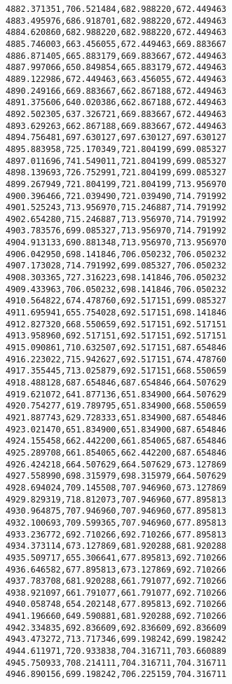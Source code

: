 \documentclass[11pt]{article}
\begin{document}
\begin{Verbatim}[commandchars=\\\{\}]
4882.371351,706.521484,682.988220,672.449463
4883.495976,686.918701,682.988220,672.449463
4884.620860,682.988220,682.988220,672.449463
4885.746003,663.456055,672.449463,669.883667
4886.871405,665.883179,669.883667,672.449463
4887.997066,650.849854,665.883179,672.449463
4889.122986,672.449463,663.456055,672.449463
4890.249166,669.883667,662.867188,672.449463
4891.375606,640.020386,662.867188,672.449463
4892.502305,637.326721,669.883667,672.449463
4893.629263,662.867188,669.883667,672.449463
4894.756481,697.630127,697.630127,697.630127
4895.883958,725.170349,721.804199,699.085327
4897.011696,741.549011,721.804199,699.085327
4898.139693,726.752991,721.804199,699.085327
4899.267949,721.804199,721.804199,713.956970
4900.396466,721.039490,721.039490,714.791992
4901.525243,713.956970,715.246887,714.791992
4902.654280,715.246887,713.956970,714.791992
4903.783576,699.085327,713.956970,714.791992
4904.913133,690.881348,713.956970,713.956970
4906.042950,698.141846,706.050232,706.050232
4907.173028,714.791992,699.085327,706.050232
4908.303365,727.316223,698.141846,706.050232
4909.433963,706.050232,698.141846,706.050232
4910.564822,674.478760,692.517151,699.085327
4911.695941,655.754028,692.517151,698.141846
4912.827320,668.550659,692.517151,692.517151
4913.958960,692.517151,692.517151,692.517151
4915.090861,710.632507,692.517151,687.654846
4916.223022,715.942627,692.517151,674.478760
4917.355445,713.025879,692.517151,668.550659
4918.488128,687.654846,687.654846,664.507629
4919.621072,641.877136,651.834900,664.507629
4920.754277,619.789795,651.834900,668.550659
4921.887743,629.728333,651.834900,687.654846
4923.021470,651.834900,651.834900,687.654846
4924.155458,662.442200,661.854065,687.654846
4925.289708,661.854065,662.442200,687.654846
4926.424218,664.507629,664.507629,673.127869
4927.558990,698.315979,698.315979,664.507629
4928.694024,709.145508,707.946960,673.127869
4929.829319,718.812073,707.946960,677.895813
4930.964875,707.946960,707.946960,677.895813
4932.100693,709.599365,707.946960,677.895813
4933.236772,692.710266,692.710266,677.895813
4934.373114,673.127869,681.920288,681.920288
4935.509717,655.306641,677.895813,692.710266
4936.646582,677.895813,673.127869,692.710266
4937.783708,681.920288,661.791077,692.710266
4938.921097,661.791077,661.791077,692.710266
4940.058748,654.202148,677.895813,692.710266
4941.196660,649.590881,681.920288,692.710266
4942.334835,692.836609,692.836609,692.836609
4943.473272,713.717346,699.198242,699.198242
4944.611971,720.933838,704.316711,703.660889
4945.750933,708.214111,704.316711,704.316711
4946.890156,699.198242,706.225159,704.316711

\end{Verbatim}
\end{document}
